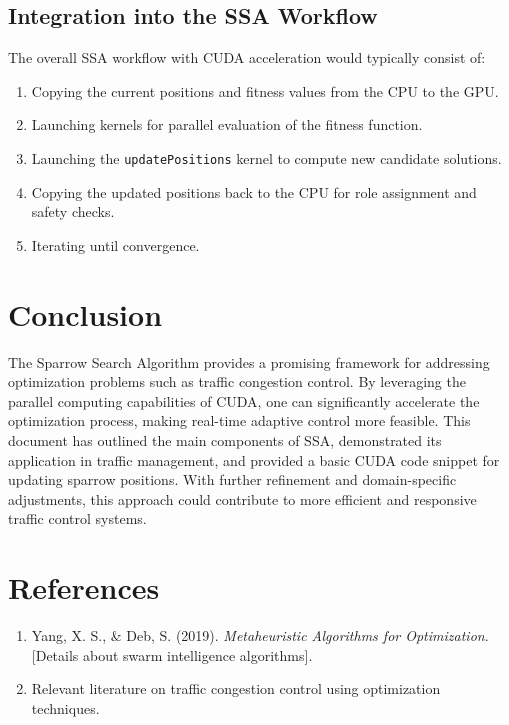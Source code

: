 \documentclass[11pt]{article}
\begin{document}
\subsection{Integration into the SSA Workflow}
The overall SSA workflow with CUDA acceleration would typically consist of:
\begin{enumerate}
    \item Copying the current positions and fitness values from the CPU to the GPU.
    \item Launching kernels for parallel evaluation of the fitness function.
    \item Launching the \texttt{updatePositions} kernel to compute new candidate solutions.
    \item Copying the updated positions back to the CPU for role assignment and safety checks.
    \item Iterating until convergence.
\end{enumerate}

\section{Conclusion}
The Sparrow Search Algorithm provides a promising framework for addressing optimization problems such as traffic congestion control. By leveraging the parallel computing capabilities of CUDA, one can significantly accelerate the optimization process, making real-time adaptive control more feasible. This document has outlined the main components of SSA, demonstrated its application in traffic management, and provided a basic CUDA code snippet for updating sparrow positions. With further refinement and domain-specific adjustments, this approach could contribute to more efficient and responsive traffic control systems.

\section*{References}
\begin{enumerate}
    \item Yang, X. S., \& Deb, S. (2019). \emph{Metaheuristic Algorithms for Optimization}. [Details about swarm intelligence algorithms].
    \item Relevant literature on traffic congestion control using optimization techniques.
\end{enumerate}
\end{document}
